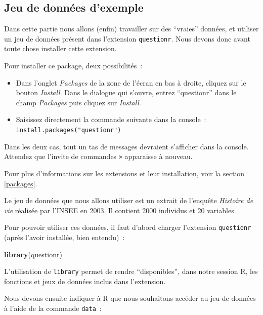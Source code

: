 \documentclass[12pt,]{book}
\newenvironment{Shaded}{\begin{snugshade}}{\end{snugshade}}
\newcommand{\KeywordTok}[1]{\textcolor[rgb]{0.13,0.29,0.53}{\textbf{#1}}}
\newcommand{\NormalTok}[1]{#1}
\providecommand{\tightlist}{%
  \setlength{\itemsep}{0pt}\setlength{\parskip}{0pt}}
\begin{document}
\hypertarget{jeu-de-donnuxe9es-dexemple}{%
\subsection{Jeu de données d'exemple}\label{jeu-de-donnuxe9es-dexemple}}

Dans cette partie nous allons (enfin) travailler sur des ``vraies'' données, et utiliser un jeu de données présent dans l'extension \texttt{questionr}. Nous devons donc avant toute chose installer cette extension.

Pour installer ce package, deux possibilités~:

\begin{itemize}
\tightlist
\item
  Dans l'onglet \emph{Packages} de la zone de l'écran en bas à droite, cliquez sur le bouton \emph{Install}. Dans le dialogue qui s'ouvre, entrez ``questionr'' dans le champ \emph{Packages} puis cliquez sur \emph{Install}.
\item
  Saisissez directement la commande suivante dans la console~: \texttt{install.packages("questionr")}
\end{itemize}

Dans les deux cas, tout un tas de messages devraient s'afficher dans la console. Attendez que l'invite de commandes \texttt{\textgreater{}} apparaisse à nouveau.

Pour plus d'informations sur les extensions et leur installation, voir la section \ref{packages}.

Le jeu de données que nous allons utiliser est un extrait de l'enquête \emph{Histoire de vie} réalisée par l'INSEE en 2003. Il contient 2000 individus et 20 variables.

Pour pouvoir utiliser ces données, il faut d'abord charger l'extension \texttt{questionr} (après l'avoir installée, bien entendu)~:

\begin{Shaded}
\begin{Highlighting}[]
\KeywordTok{library}\NormalTok{(questionr)}
\end{Highlighting}
\end{Shaded}

L'utilisation de \texttt{library} permet de rendre ``disponibles'', dans notre session R, les fonctions et jeux de données inclus dans l'extension.

Nous devons ensuite indiquer à R que nous souhaitons accéder au jeu de données à l'aide de la commande \texttt{data}~:
\end{document}
